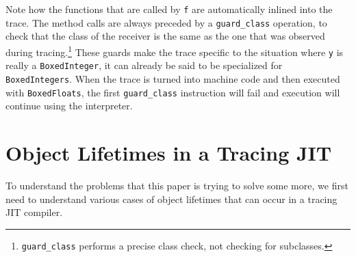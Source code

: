 \documentclass{sigplanconf}
\begin{document}
Note how the functions that are called by \texttt{f} are automatically inlined
into the trace. The method calls are always preceded by a \texttt{guard\_class}
operation, to check that the class of the receiver is the same as the one that
was observed during tracing.\footnote{\texttt{guard\_class} performs a precise
class check, not checking for subclasses.} These guards make the trace specific
to the situation where \texttt{y} is really a \texttt{BoxedInteger}, it can
already be said to be specialized for \texttt{BoxedIntegers}. When the trace is
turned into machine code and then executed with \texttt{BoxedFloats}, the
first \texttt{guard\_class} instruction will fail and execution will continue
using the interpreter.


\section{Object Lifetimes in a Tracing JIT}
\label{sec:lifetimes}


To understand the problems that this paper is trying to solve some more, we
first need to understand various cases of object lifetimes that can occur in a
tracing JIT compiler.
\end{document}
